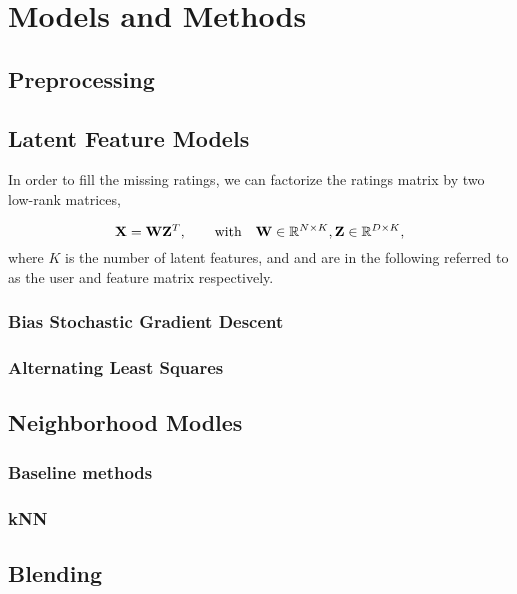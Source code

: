 \section{Models and Methods}

\subsection{Preprocessing}



\subsection{Latent Feature Models}
\label{sec:methods}

In order to fill the missing ratings, we can 
factorize the ratings matrix by two low-rank matrices, 

\begin{equation}
  \mathbf{X} = \mathbf{W}\mathbf{Z}^T ,\hspace{2em} \text{with} \hspace{1em} \mathbf{W} \in\mathbb{R}^{N \times K},
  \mathbf{Z} \in\mathbb{R}^{D \times K}, 
\end{equation}
where $K$ is the number of latent features, and  and  are in the following
referred to as the user and feature matrix respectively.

\subsubsection{Bias Stochastic Gradient Descent}


\subsubsection{Alternating Least Squares}


\subsection{Neighborhood Modles}

\subsubsection{Baseline methods}


\subsubsection{kNN}


\subsection{Blending}
\label{sec:blending}



